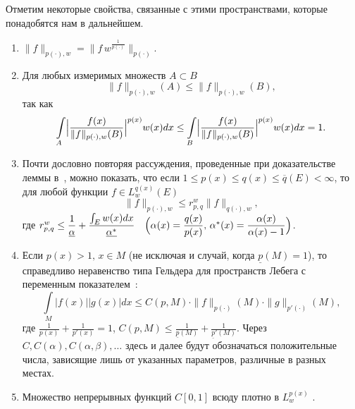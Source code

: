Отметим некоторые свойства, связанные с этими пространствами, которые понадобятся нам в дальнейшем.
{
\renewcommand{\theenumi}{\arabic{enumi}$^\circ$}
\begin{enumerate}
\item\label{normLpxwLpx}
$\|f\|_{p(\cdot),w}=\|f \, w^{\frac{1}{p(\cdot)}}\|_{p(\cdot)}$.
\item\label{normPropSets}
Для любых измеримых множеств $A \subset B$
\begin{equation*}
  \|f\|_{p(\cdot),w}(A) \le \|f\|_{p(\cdot),w}(B),
\end{equation*}
так как
\begin{equation*}
  \int\limits_{A}\Bigl|\frac{f(x)}{\|f\|_{p(\cdot),w}(B)}\Bigr|^{p(x)}w(x)dx \le
  \int\limits_{B}\Bigl|\frac{f(x)}{\|f\|_{p(\cdot),w}(B)}\Bigr|^{p(x)}w(x)dx = 1.
\end{equation*}

\item\label{normpq}
Почти дословно повторяя рассуждения, проведенные при доказательстве леммы в~\cite{shii-haar-basis}, можно показать, что если $1\le p(x) \le q(x) \le \overline{q}(E) < \infty$, то для любой функции $f \in L^{q(x)}_w(E)$
\begin{equation*}
  \|f\|_{p(\cdot),w} \le r_{p,q}^w \|f\|_{q(\cdot),w},
\end{equation*}
где
$r_{p,q}^w \le \dfrac{1}{\underline{\alpha}}+\dfrac{\int_E w(x)dx}{\underline{\alpha^*}} \quad
\Bigl(\alpha(x)=\dfrac{q(x)}{p(x)}, \, \alpha^*(x)=\dfrac{\alpha(x)}{\alpha(x)-1}\Bigr)$.

\item\label{Holder}
Если $p(x)>1,\, x \in M$ (не исключая и случай, когда $\underline{p}(M)=1$), то справедливо неравенство типа Гельдера для пространств Лебега с переменным показателем~\cite[нер-во (8)]{shii-lpx}:
\begin{equation*}
  \int\limits_M |f(x)||g(x)|dx \le
  C(p,M) \cdot \|f\|_{p(\cdot)}(M) \cdot \|g\|_{p'(\cdot)}(M),
\end{equation*}
где $\frac{1}{p(x)}+\frac{1}{p'(x)}=1$, $C(p,M)\le \frac{1}{\underline{p}(M)}+\frac{1}{\underline{p}'(M)}$.
Через $C, C(\alpha), C(\alpha,\beta),\ldots$ здесь и далее будут обозначаться положительные числа, зависящие лишь от указанных параметров, различные в разных местах.

\item\label{lemmaDensity}
Множество непрерывных функций $C[0,1]$ всюду плотно в $L^{p(x)}_w$ \cite{mmg-haarspeed}.


\end{enumerate}}
